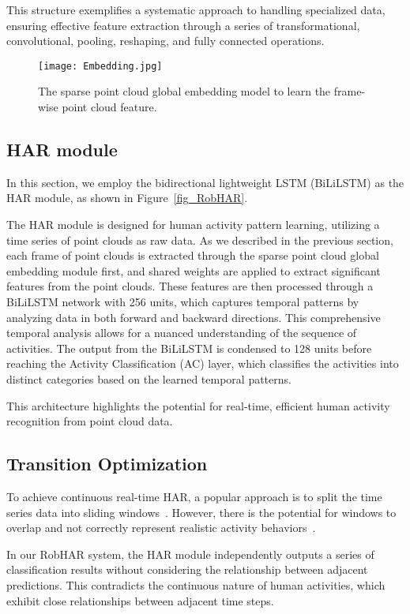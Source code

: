 This structure exemplifies a systematic approach to handling specialized data, ensuring effective feature extraction through a series of transformational, convolutional, pooling, reshaping, and fully connected operations.

\begin{figure}
    \centering
    \texttt{[image: Embedding.jpg]}
    \caption{The sparse point cloud global embedding model to learn the frame-wise point cloud feature.}
    \label{fig_Embedding}
\end{figure}


\subsection{HAR module}
In this section, we employ the bidirectional lightweight LSTM (BiLiLSTM) as the HAR module, as shown in Figure~\ref{fig_RobHAR}. 

The HAR module is designed for human activity pattern learning, utilizing a time series of point clouds as raw data. 
As we described in the previous section, each frame of point clouds is extracted through the sparse point cloud global embedding module first, and shared weights are applied to extract significant features from the point clouds. 
These features are then processed through a BiLiLSTM network with 256 units, which captures temporal patterns by analyzing data in both forward and backward directions. This comprehensive temporal analysis allows for a nuanced understanding of the sequence of activities. 
The output from the BiLiLSTM is condensed to 128 units before reaching the Activity Classification (AC) layer, which classifies the activities into distinct categories based on the learned temporal patterns. 

This architecture highlights the potential for real-time, efficient human activity recognition from point cloud data.

\subsection{Transition Optimization}
To achieve continuous real-time HAR, a popular approach is to split the time series data into sliding windows~\cite{morrison2020representing}. 
However, there is the potential for windows to overlap and not correctly represent realistic activity behaviors~\cite{coppola2019social}.

In our RobHAR system, the HAR module independently outputs a series of classification results without considering the relationship between adjacent predictions. This contradicts the continuous nature of human activities, which exhibit close relationships between adjacent time steps.

